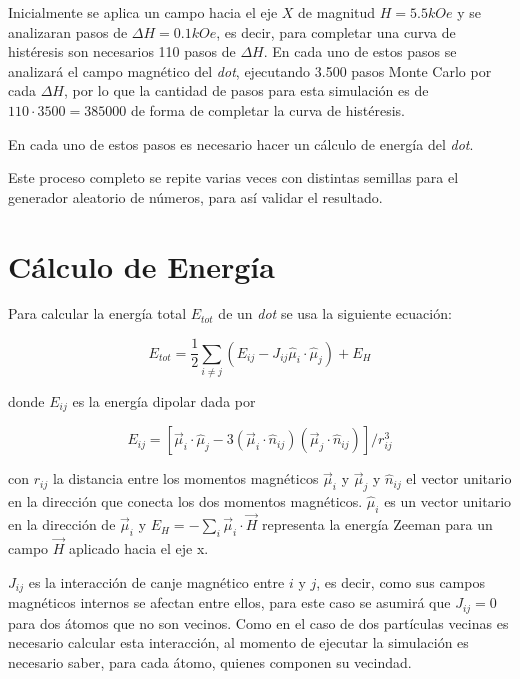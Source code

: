 Inicialmente se aplica un campo hacia el eje $X$ de magnitud $H=5.5kOe$ y se analizaran pasos de $\Delta H = 0.1kOe$, es decir, para completar una curva de histéresis son necesarios 110 pasos de $\Delta H$. En cada uno de estos pasos se analizará el campo magnético del \emph{dot}, ejecutando 3.500 pasos Monte Carlo por cada $\Delta H$, por lo que la cantidad de pasos para esta simulación es de $110 \cdot 3500 = 385000$ de forma de completar la curva de histéresis.

En cada uno de estos pasos es necesario hacer un cálculo de energía del \emph{dot}.

Este proceso completo se repite varias veces con distintas semillas para el generador aleatorio de números, para así validar el resultado.

\section{Cálculo de Energía}

Para calcular la energía total $E_{tot}$ de un \emph{dot} se usa la siguiente ecuación:

\begin{center}
  $$E_{tot} = \frac{1}{2} \sum_{i \neq j} (E_{ij} - J_{ij} \hat{\mu}_i \cdot \hat{\mu}_j) + E_H$$
\end{center}

\noindent
donde $E_{ij}$ es la energía dipolar dada por

\begin{center}
  $$E_{ij} = [\vec{\mu}_i \cdot \hat{\mu}_j - 3(\vec{\mu}_i \cdot \hat{n}_{ij})(\vec{\mu}_j \cdot \hat{n}_{ij})]/ r^3_{ij}$$
\end{center}

\noindent
con $r_{ij}$ la distancia entre los momentos magnéticos $\vec{\mu}_i$  y $\vec{\mu}_j$ y $\hat{n}_{ij}$ el vector unitario en la dirección que conecta los dos momentos magnéticos. $\hat{\mu}_i$ es un vector unitario en la dirección de $\vec{\mu}_i$ y $E_H = - \sum_i \vec{\mu}_i \cdot \vec{H}$ representa la energía Zeeman para un campo $\vec{H}$ aplicado hacia el eje x.

$J_{ij}$ es la interacción de canje magnético entre $i$ y $j$, es decir, como sus campos magnéticos internos se afectan entre ellos, para este caso se asumirá que $J_{ij} = 0$ para dos átomos que no son vecinos. Como en el caso de dos partículas vecinas es necesario calcular esta interacción, al momento de ejecutar la simulación es necesario saber, para cada átomo, quienes componen su vecindad.

